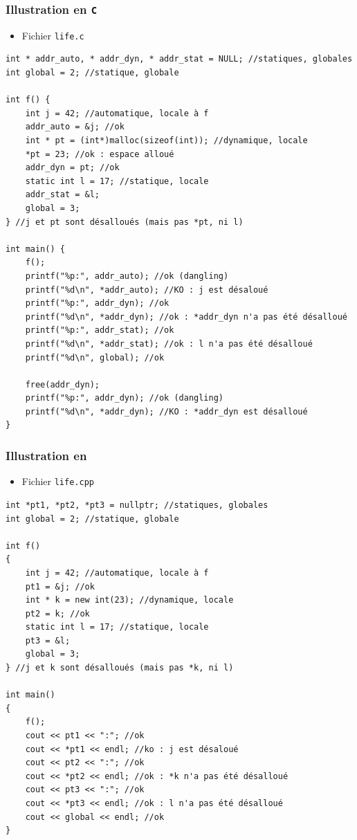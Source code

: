 \begin{frame}[containsverbatim]
\frametitle{Illustration en \texttt{C}}
\begin{itemize}
\item Fichier \texttt{life.c}
\end{itemize}
\begin{lstlisting}
int * addr_auto, * addr_dyn, * addr_stat = NULL; //statiques, globales
int global = 2; //statique, globale

int f() {
	int j = 42; //automatique, locale à f
	addr_auto = &j; //ok
	int * pt = (int*)malloc(sizeof(int)); //dynamique, locale
    *pt = 23; //ok : espace alloué
	addr_dyn = pt; //ok
    static int l = 17; //statique, locale
    addr_stat = &l;
	global = 3;
} //j et pt sont désalloués (mais pas *pt, ni l)

int main() {
	f();
    printf("%p:", addr_auto); //ok (dangling)
    printf("%d\n", *addr_auto); //KO : j est désaloué	
    printf("%p:", addr_dyn); //ok
    printf("%d\n", *addr_dyn); //ok : *addr_dyn n'a pas été désalloué	
    printf("%p:", addr_stat); //ok
    printf("%d\n", *addr_stat); //ok : l n'a pas été désalloué
    printf("%d\n", global); //ok    
    
    free(addr_dyn);
    printf("%p:", addr_dyn); //ok (dangling)
    printf("%d\n", *addr_dyn); //KO : *addr_dyn est désalloué	    
}
\end{lstlisting}
\end{frame}

\begin{frame}[containsverbatim]
\frametitle{Illustration en \cpp}
\begin{itemize}
\item Fichier \texttt{life.cpp}
\end{itemize}
\begin{lstlisting}
int *pt1, *pt2, *pt3 = nullptr; //statiques, globales
int global = 2; //statique, globale

int f()
{
	int j = 42; //automatique, locale à f
	pt1 = &j; //ok
	int * k = new int(23); //dynamique, locale
	pt2 = k; //ok
	static int l = 17; //statique, locale
	pt3 = &l;
	global = 3;
} //j et k sont désalloués (mais pas *k, ni l)

int main()
{
	f();
	cout << pt1 << ":"; //ok
	cout << *pt1 << endl; //ko : j est désaloué
	cout << pt2 << ":"; //ok
	cout << *pt2 << endl; //ok : *k n'a pas été désalloué
	cout << pt3 << ":"; //ok
	cout << *pt3 << endl; //ok : l n'a pas été désalloué
	cout << global << endl; //ok
}
\end{lstlisting}
\end{frame}

